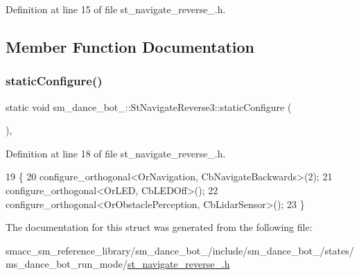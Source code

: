 Definition at line 15 of file st\+\_\+navigate\+\_\+reverse\+\_.\+h.



\subsection{Member Function Documentation}
\mbox{\label{structsm__dance__bot__2_1_1StNavigateReverse3_ab9ffbcdda77a9655dc05926ba5b67692}} 
\subsubsection{\texorpdfstring{static\+Configure()}{staticConfigure()}}
{\footnotesize\ttfamily static void sm\+\_\+dance\+\_\+bot\+\_\+::\+St\+Navigate\+Reverse3\+::static\+Configure (\begin{DoxyParamCaption}{ }\end{DoxyParamCaption})\hspace{0.3cm}{\ttfamily [inline]}, {\ttfamily [static]}}



Definition at line 18 of file st\+\_\+navigate\+\_\+reverse\+\_.\+h.


\begin{DoxyCode}
19    \{
20       configure\_orthogonal<OrNavigation, CbNavigateBackwards>(2);
21       configure\_orthogonal<OrLED, CbLEDOff>();
22       configure\_orthogonal<OrObstaclePerception, CbLidarSensor>();
23    \}
\end{DoxyCode}


The documentation for this struct was generated from the following file\+:\begin{DoxyCompactItemize}
\item 
smacc\+\_\+sm\+\_\+reference\+\_\+library/sm\+\_\+dance\+\_\+bot\+\_/include/sm\+\_\+dance\+\_\+bot\+\_/states/ms\+\_\+dance\+\_\+bot\+\_\+run\+\_\+mode/\hyperlink{2_2include_2sm__dance__bot__2_2states_2ms__dance__bot__run__mode_2st__navigate__reverse__3_8h}{st\+\_\+navigate\+\_\+reverse\+\_.\+h}\end{DoxyCompactItemize}

